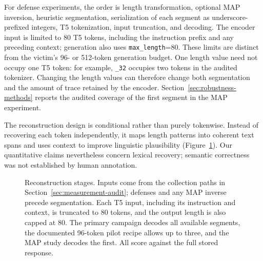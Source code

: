 \documentclass[electronics,article,submit,pdftex,moreauthors]{Definitions/mdpi}
\begin{document}
For defense experiments, the order is length transformation, optional MAP inversion, heuristic segmentation, serialization of each segment as underscore-prefixed integers, T5 tokenization, input truncation, and decoding. The encoder input is limited to 80 T5 tokens, including the instruction prefix and any preceding context; generation also uses \texttt{max\_length}=80. These limits are distinct from the victim's 96- or 512-token generation budget. One length value need not occupy one T5 token: for example, \texttt{\_32} occupies two tokens in the audited tokenizer. Changing the length values can therefore change both segmentation and the amount of trace retained by the encoder. Section~\ref{sec:robustness-methods} reports the audited coverage of the first segment in the MAP experiment.

The reconstruction design is conditional rather than purely tokenwise. Instead of recovering each token independently, it maps length patterns into coherent text spans and uses context to improve linguistic plausibility (Figure~\ref{fig:pipeline}). Our quantitative claims nevertheless concern lexical recovery; semantic correctness was not established by human annotation.

\begin{figure}[ht]
\centering
{}
\caption{Reconstruction stages. Inputs come from the collection paths in Section~\ref{sec:measurement-audit}; defenses and any MAP inverse precede segmentation. Each T5 input, including its instruction and context, is truncated to 80 tokens, and the output length is also capped at 80. The primary campaign decodes all available segments, the documented 96-token pilot recipe allows up to three, and the MAP study decodes the first. All score against the full stored response.}
\label{fig:pipeline}
\end{figure}
\end{document}
